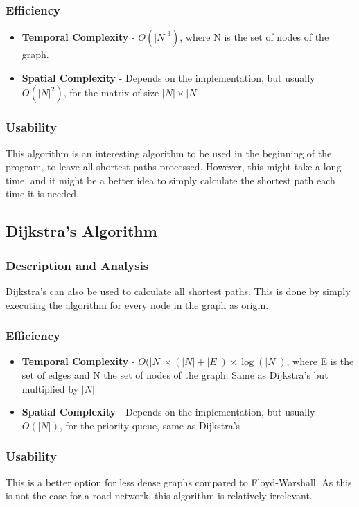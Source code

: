 \subsubsection{Efficiency}
\begin{itemize}
    \item \textbf{Temporal Complexity} - $ O(|N|^3) $, where N is the set of nodes of the graph.
    \item \textbf{Spatial Complexity} - Depends on the implementation, but usually $ O(|N|^2) $, for the matrix of size $|N| \times |N|$
\end{itemize}

\subsubsection{Usability}
This algorithm is an interesting algorithm to be used in the beginning of the program, to leave all shortest paths processed. However, this might take a long time, and it might be a better idea to simply calculate the shortest path each time it is needed.


\subsection{Dijkstra's Algorithm}

\subsubsection{Description and Analysis}
Dijkstra's can also be used to calculate all shortest paths. This is done by simply executing the algorithm for every node in the graph as origin.
 
\subsubsection{Efficiency}
\begin{itemize}
    \item \textbf{Temporal Complexity} - $ O(|N| \times (|N|+|E|) \times \log(|N|) $, where E is the set of edges and N the set of nodes of the graph. Same as Dijkstra's but multiplied by $|N|$
    \item \textbf{Spatial Complexity} - Depends on the implementation, but usually $ O(|N|) $, for the priority queue, same as Dijkstra's
\end{itemize}

\subsubsection{Usability}
This is a better option for less dense graphs compared to Floyd-Warshall. As this is not the case for a road network, this algorithm is relatively irrelevant.



